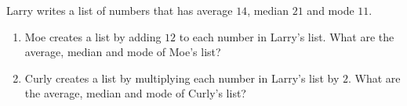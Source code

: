Larry writes a list of numbers that has average $14$, median $21$ and mode $11$.
\begin{enumerate}
\item[(a)] Moe creates a list by adding $12$ to each number in Larry's list. What are the average, median and mode of Moe's list?
\item[(b)] Curly creates a list by multiplying each number in Larry's list by $2$. What are the average, median and mode of Curly's list?
\end{enumerate}
